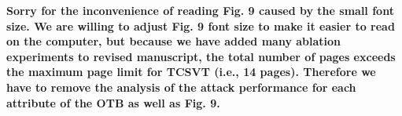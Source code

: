 \documentclass[12pt]{article}
\begin{document}





\textbf{Sorry for the inconvenience of reading Fig. 9 caused by the small font size.
We are willing to adjust Fig. 9 font size to make it easier to read on the computer, but because we have added many ablation experiments to revised manuscript, the total number of pages exceeds the maximum page limit for TCSVT (i.e., 14 pages). Therefore we have to remove the analysis of the attack performance for each attribute of the OTB as well as Fig. 9.
}
\end{document}
